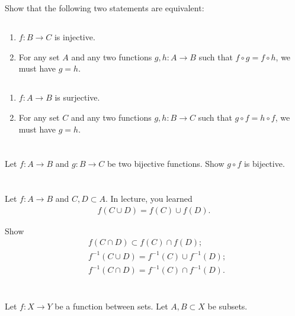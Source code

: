 \documentclass[11pt,letterpaper]{article}
\begin{document}
\section{}
Show that the following two statements are equivalent:

\subsection{}
\begin{enumerate}
    \item $f: B\to C$ is injective.
    \item For any set $A$ and any two functions $g,h: A\to B$ such that $f\circ g = f\circ h$, we must have $g=h$. 
\end{enumerate}

\subsection{}
\begin{enumerate}
    \item $f: A\to B$ is surjective.
    \item For any set $C$ and any two functions $g,h: B\to C$ such that $g\circ f = h\circ f$, we must have $g=h$. 
\end{enumerate}

\section{}
Let $f: A\to B$ and $g: B\to C$ be two bijective functions.  Show $g\circ f$ is bijective.

\section{}
Let $f: A\to B$ and $C, D\subset A$. In lecture, you learned 
\begin{align}
    f(C\cup D) = f(C)\cup f(D).
\end{align}

Show
\begin{align}
    &f(C\cap D) \subset f(C)\cap f(D);\\
    &f^{-1}(C\cup D) = f^{-1}(C)\cup f^{-1}(D);\\
    &f^{-1}(C\cap D) = f^{-1}(C)\cap f^{-1}(D).
\end{align}

\section{}
Let $f: X\to Y$ be a function between sets. Let $A,B\subset X$ be subsets. 
\end{document}
